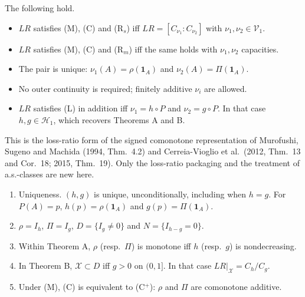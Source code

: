 \begin{theorem}
The following hold.
\begin{itemize}
\item $LR$ satisfies (M), (C) and (R$_s$) iff $LR=[C_{\nu_1}:C_{\nu_2}]$ with $\nu_1,\nu_2\in\mathcal V_1$.
\item $LR$ satisfies (M), (C) and (R$_m$) iff the same holds with $\nu_1,\nu_2$ capacities.
\item The pair is unique: $\nu_1(A)=\rho(\mathbf 1_A)$ and $\nu_2(A)=\Pi(\mathbf 1_A)$.
\item No outer continuity is required; finitely additive $\nu_i$ are allowed.
\item $LR$ satisfies (L) in addition iff $\nu_1=h\circ P$ and $\nu_2=g\circ P$. In that case $h,g\in\mathcal H_1$, which recovers Theorems A and B.
\end{itemize}
This is the loss-ratio form of the signed comonotone representation of Murofushi, Sugeno and Machida (1994, Thm.~4.2) and Cerreia-Vioglio et al.\ (2012, Thm.~13 and Cor.~18; 2015, Thm.~19). Only the loss-ratio packaging and the treatment of a.s.-classes are new here.
\end{theorem}

\begin{proposition}
\begin{enumerate}
\item[(i)] Uniqueness. $(h,g)$ is unique, unconditionally, including when $h=g$. For $P(A)=p$, $h(p)=\rho(\mathbf 1_A)$ and $g(p)=\Pi(\mathbf 1_A)$.
\item[(ii)] $\rho=I_h$, $\Pi=I_g$, $D=\{I_g\neq0\}$ and $N=\{I_{h-g}=0\}$.
\item[(iii)] Within Theorem A, $\rho$ (resp.\ $\Pi$) is monotone iff $h$ (resp.\ $g$) is nondecreasing.
\item[(iv)] In Theorem B, $\mathcal X\subset D$ iff $g>0$ on $(0,1]$. In that case $LR|_{\mathcal X}=C_h/C_g$.
\item[(v)] Under (M), (C) is equivalent to (C$^+$): $\rho$ and $\Pi$ are comonotone additive.
\end{enumerate}
\end{proposition}

